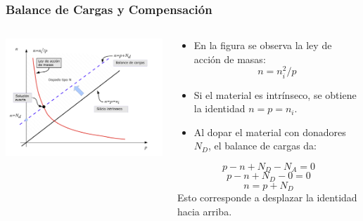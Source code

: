 \documentclass[10pt,t,aspectratio=169]{beamer}
\begin{document}
\begin{frame}[t]
  \frametitle{Balance de Cargas y Compensación}

  \begin{columns}
    \begin{column}{0.6\textwidth}
      \includegraphics[width=9.5cm]{./figures/curvanvsp.png}      
    \end{column}
    \begin{column}{0.4\textwidth}
      
      \begin{itemize}
        \item En la figura se observa la ley de acción de masas:
        \[ n = n_i^2/p \]
        \item Si el material es intrínseco, se obtiene la identidad $n=p=n_i$.
        \item Al dopar el material con donadores $N_D$, el balance de cargas da:
      \end{itemize}
      \[ p - n + N_D - N_A = 0 \]
      \[ p - n + N_D - 0 = 0 \]
      \[ n = p + N_D \]
      Esto corresponde a desplazar la identidad hacia arriba.
    \end{column}
  \end{columns}

\end{frame}
\end{document}
